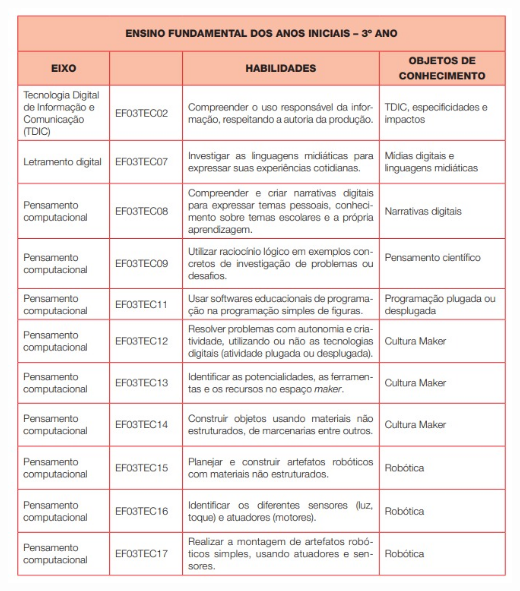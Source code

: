 \begin{center}
	\includegraphics[height=\textheight]{./IMG-GIT/ano-3.jpeg}
\end{center}

\pagebreak

%

\pagebreak

